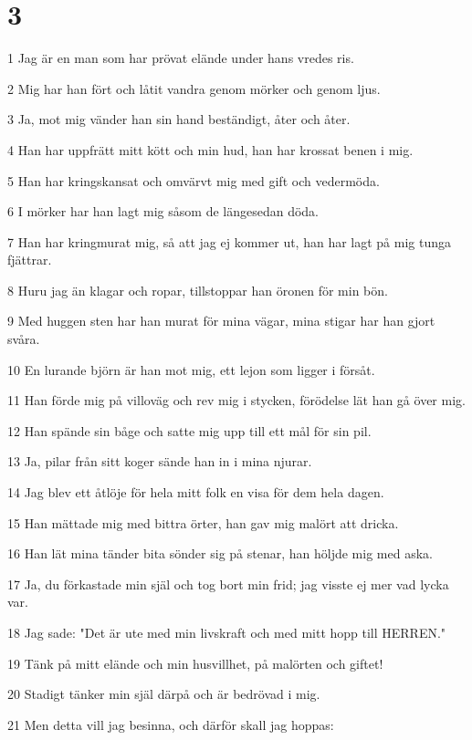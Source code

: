 \chapter{3}

\par 1 Jag är en man som har prövat elände under hans vredes ris.
\par 2 Mig har han fört och låtit vandra genom mörker och genom ljus.
\par 3 Ja, mot mig vänder han sin hand beständigt, åter och åter.
\par 4 Han har uppfrätt mitt kött och min hud, han har krossat benen i mig.
\par 5 Han har kringskansat och omvärvt mig med gift och vedermöda.
\par 6 I mörker har han lagt mig såsom de längesedan döda.
\par 7 Han har kringmurat mig, så att jag ej kommer ut, han har lagt på mig tunga fjättrar.
\par 8 Huru jag än klagar och ropar, tillstoppar han öronen för min bön.
\par 9 Med huggen sten har han murat för mina vägar, mina stigar har han gjort svåra.
\par 10 En lurande björn är han mot mig, ett lejon som ligger i försåt.
\par 11 Han förde mig på villoväg och rev mig i stycken, förödelse lät han gå över mig.
\par 12 Han spände sin båge och satte mig upp till ett mål för sin pil.
\par 13 Ja, pilar från sitt koger sände han in i mina njurar.
\par 14 Jag blev ett åtlöje för hela mitt folk en visa för dem hela dagen.
\par 15 Han mättade mig med bittra örter, han gav mig malört att dricka.
\par 16 Han lät mina tänder bita sönder sig på stenar, han höljde mig med aska.
\par 17 Ja, du förkastade min själ och tog bort min frid; jag visste ej mer vad lycka var.
\par 18 Jag sade: "Det är ute med min livskraft och med mitt hopp till HERREN."
\par 19 Tänk på mitt elände och min husvillhet, på malörten och giftet!
\par 20 Stadigt tänker min själ därpå och är bedrövad i mig.
\par 21 Men detta vill jag besinna, och därför skall jag hoppas:
